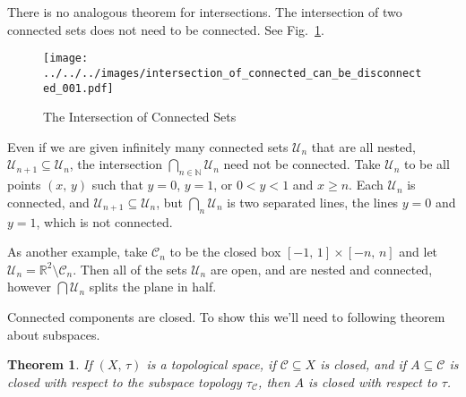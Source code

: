 \documentclass{article}
\theoremstyle{plain}
\newtheorem{theorem}{Theorem}[section]
\theoremstyle{normal}
\begin{document}
        There is no analogous theorem for intersections. The intersection
        of two connected sets does not need to be connected. See
        Fig.~\ref{fig:intersection_of_connected_can_be_disconnected_001}.
        \begin{figure}
            \centering
            \texttt{[image: ../../../images/intersection\_of\_connected\_can\_be\_disconnected\_001.pdf]}
            \caption{The Intersection of Connected Sets}
            \label{fig:intersection_of_connected_can_be_disconnected_001}
        \end{figure}
        Even if we are given infinitely many connected sets
        $\mathcal{U}_{n}$ that are all nested,
        $\mathcal{U}_{n+1}\subseteq\mathcal{U}_{n}$, the intersection
        $\bigcap_{n\in\mathbb{N}}\mathcal{U}_{n}$ need not be connected.
        Take $\mathcal{U}_{n}$ to be all points $(x,\,y)$ such that
        $y=0$, $y=1$, or $0<y<1$ and $x\geq{n}$. Each $\mathcal{U}_{n}$ is
        connected, and $\mathcal{U}_{n+1}\subseteq\mathcal{U}_{n}$, but
        $\bigcap_{n}\mathcal{U}_{n}$ is two separated lines, the lines
        $y=0$ and $y=1$, which is not connected.
        \par\hfill\par
        As another example, take $\mathcal{C}_{n}$ to be the closed box
        $[-1,\,1]\times[-n,\,n]$ and let
        $\mathcal{U}_{n}=\mathbb{R}^{2}\setminus\mathcal{C}_{n}$. Then all of
        the sets $\mathcal{U}_{n}$ are open, and are nested and connected,
        however $\bigcap\mathcal{U}_{n}$ splits the plane in half.
        \par\hfill\par
        Connected components are closed. To show this we'll need to following
        theorem about subspaces.
        \begin{theorem}
            If $(X,\,\tau)$ is a topological space, if $\mathcal{C}\subseteq{X}$
            is closed, and if $A\subseteq\mathcal{C}$ is closed with respect
            to the subspace topology $\tau_{\mathcal{C}}$, then $A$ is closed
            with respect to $\tau$.
        \end{theorem}
\end{document}
